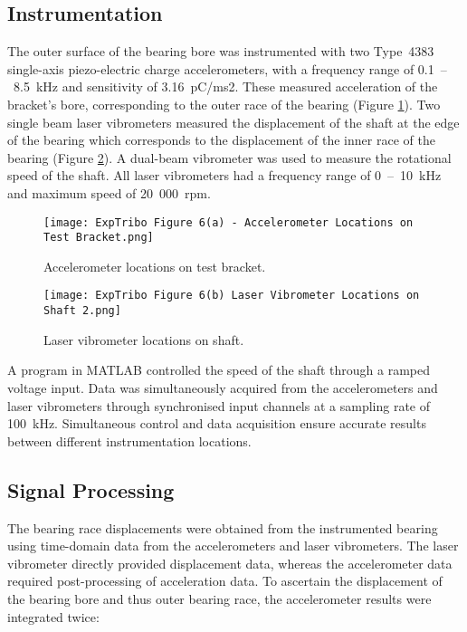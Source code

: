 \subsection{Instrumentation}
The outer surface of the bearing bore was instrumented with two Type~4383 single-axis piezo-electric charge accelerometers, with a frequency range of 0.1~–~8.5~kHz and sensitivity of 3.16~pC/ms2.  These measured acceleration of the bracket’s bore, corresponding to the outer race of the bearing (Figure \ref{Accelerometer locations on test bracket}). Two single beam laser vibrometers measured the displacement of the shaft at the edge of the bearing which corresponds to the displacement of the inner race of the bearing (Figure \ref{Laser vibrometer locations on shaft}). A dual-beam vibrometer was used to measure the rotational speed of the shaft. All laser vibrometers had a frequency range of 0~–~10~kHz and maximum speed of 20~000~rpm.

\begin{figure}
	\centerline{\texttt{[image: ExpTribo Figure 6(a) - Accelerometer Locations on Test Bracket.png]}}
	\caption{Accelerometer locations on test bracket.}
	\label{Accelerometer locations on test bracket}
\end{figure}

\begin{figure}
	\centerline{\texttt{[image: ExpTribo Figure 6(b) Laser Vibrometer Locations on Shaft 2.png]}}
	\caption{Laser vibrometer locations on shaft.}
	\label{Laser vibrometer locations on shaft}
\end{figure}

A program in MATLAB controlled the speed of the shaft through a ramped voltage input. Data was simultaneously acquired from the accelerometers and laser vibrometers through synchronised input channels at a sampling rate of 100~kHz. Simultaneous control and data acquisition ensure accurate results between different instrumentation locations.

\subsection{Signal Processing}
The bearing race displacements were obtained from the instrumented bearing using time-domain data from the accelerometers and laser vibrometers. The laser vibrometer directly provided displacement data, whereas the accelerometer data required post-processing of acceleration data. To ascertain the displacement of the bearing bore and thus outer bearing race, the accelerometer results were integrated twice:

